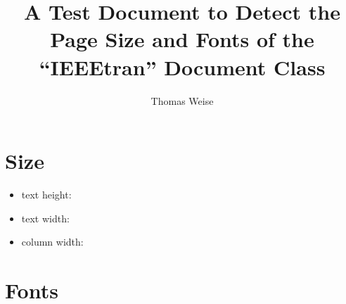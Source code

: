 \documentclass{IEEEtran}%
\begin{document}
%
%
\title{A Test Document to Detect the Page Size and Fonts of the ``IEEEtran'' Document Class}%
\author{Thomas Weise}%
%
\maketitle%
%
%
\section{Size}%
%
\begin{itemize}%
\item text height: \the\textheight%
\item text width: \the\textwidth%
\item column width: \the\columnwidth%
\end{itemize}%
%
\section{Fonts}%
%
\end{document}
